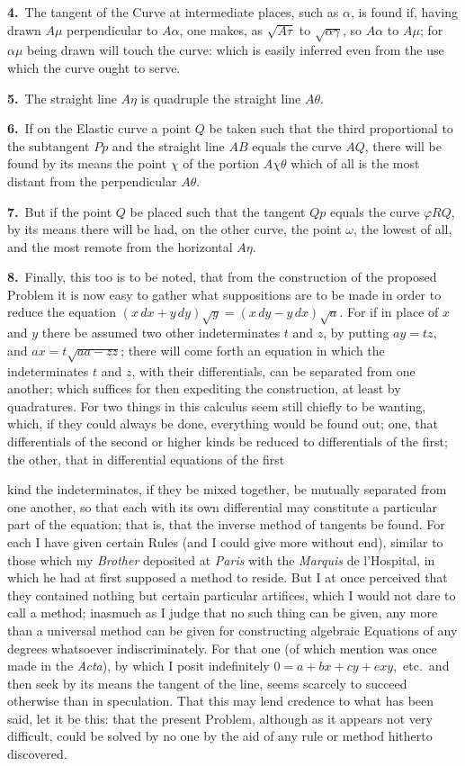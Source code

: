 \documentclass{article}
\begin{document}
\textbf{4.}~The tangent of the Curve at intermediate places, such as $\alpha$, is found if, having
drawn $A\mu$ perpendicular to $A\alpha$, one makes, as $\sqrt{A\tau}$ to $\sqrt{\alpha\gamma}$, so
$A\alpha$ to $A\mu$; for $\alpha\mu$ being drawn will touch the curve: which is easily inferred even
from the use which the curve ought to serve.

\textbf{5.}~The straight line $A\eta$ is quadruple the straight line $A\theta$.

\textbf{6.}~If on the Elastic curve a point $Q$ be taken such that the third proportional to the
subtangent $Pp$ and the straight line $AB$ equals the curve $AQ$, there will be found by its means
the point $\chi$ of the portion $A\chi\theta$ which of all is the most distant from the perpendicular
$A\theta$.

\textbf{7.}~But if the point $Q$ be placed such that the tangent $Qp$ equals the curve $\varphi RQ$,
by its means there will be had, on the other curve, the point $\omega$, the lowest of all, and the
most remote from the horizontal $A\eta$.

\textbf{8.}~Finally, this too is to be noted, that from the construction of the proposed Problem it
is now easy to gather what suppositions are to be made in order to reduce the equation
$(x\,dx + y\,dy)\sqrt{y} = (x\,dy - y\,dx)\sqrt{a}$. For if in place of $x$ and $y$ there be
assumed two other indeterminates $t$ and $z$, by putting $ay = tz$, and
$ax = t\sqrt{aa - zz}$; there will come forth an equation in which the indeterminates $t$ and $z$,
with their differentials, can be separated from one another; which suffices for then expediting the
construction, at least by quadratures. For two things in this calculus seem still chiefly to be
wanting, which, if they could always be done, everything would be found out; one, that differentials
of the second or higher kinds be reduced to differentials of the first; the other, that in
differential equations of the first

kind the indeterminates, if they be mixed together, be mutually separated from one another, so that
each with its own differential may constitute a particular part of the equation; that is, that the
inverse method of tangents be found. For each I have given certain Rules (and I could give more
without end), similar to those which my \emph{Brother} deposited at \emph{Paris} with the
\emph{Marquis} de l'Hospital, in which he had at first supposed a method to reside. But I at once
perceived that they contained nothing but certain particular artifices, which I would not dare to
call a method; inasmuch as I judge that no such thing can be given, any more than a universal method
can be given for constructing algebraic Equations of any degrees whatsoever indiscriminately. For
that one (of which mention was once made in the \emph{Acta}), by which I posit indefinitely
$0 = a + bx + cy + exy$,~etc.\ and then seek by its means the tangent of the line, seems scarcely to
succeed otherwise than in speculation. That this may lend credence to what has been said, let it be
this: that the present Problem, although as it appears not very difficult, could be solved by no one
by the aid of any rule or method hitherto discovered.
\end{document}
